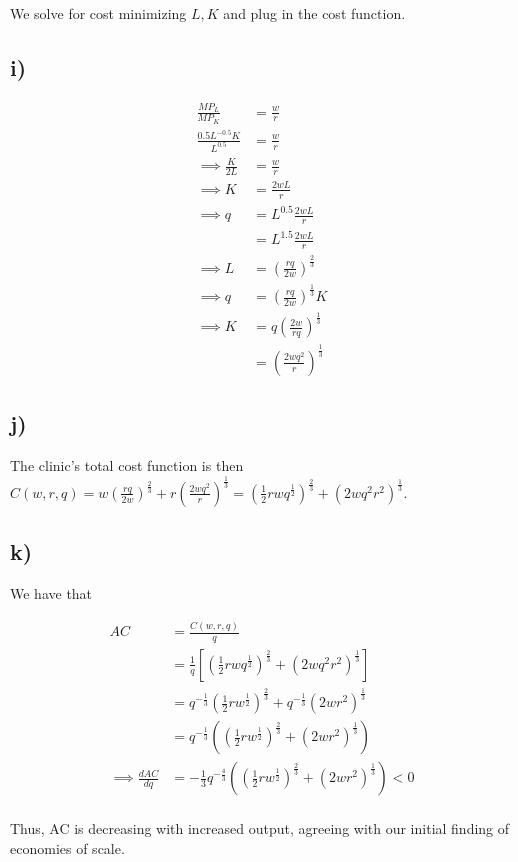 \documentclass[12pt,letterpaper]{article}
\theoremstyle{definition}
\begin{document}
We solve for cost minimizing $L,K$ and plug in the cost function.

\subsection*{i)}

\begin{align*}
  \frac{MP_L}{MP_K} &= \frac{w}{r} \\
  \frac{0.5L^{-0.5}K}{L^{0.5}} &= \frac{w}{r} \\
  \implies \frac{K}{2L} &= \frac{w}{r} \\
  \implies K &= \frac{2wL}{r} \\
  \implies q &= L^{0.5}\frac{2wL}{r} \\
                    &= L^{1.5}\frac{2wL}{r} \\
  \implies L&= (\frac{rq}{2w})^{\frac{2}{3}} \\
  \implies q &= (\frac{rq}{2w})^{\frac{1}{3}} K \\
  \implies K &= q(\frac{2w}{rq})^{\frac{1}{3}} \\
                    &= (\frac{2wq^2}{r})^{\frac{1}{3}}
\end{align*}

\subsection*{j)}

The clinic's total cost function is then $C(w,r,q) =
w(\frac{rq}{2w})^{\frac{2}{3}} + r(\frac{2wq^2}{r})^{\frac{1}{3}} =
(\frac{1}{2}rwq^{\frac{1}{2}})^{\frac{2}{3}} + (2wq^2r^2)^{\frac{1}{3}}$.

\subsection*{k)}

We have that

\begin{align*}
  AC &= \frac{C(w,r,q)}{q} \\
     &= \frac{1}{q} [(\frac{1}{2}rwq^{\frac{1}{2}})^{\frac{2}{3}} + (2wq^2r^2)^{\frac{1}{3}}] \\
     &= q^{-\frac{1}{3}}(\frac{1}{2}rw^{\frac{1}{2}})^{\frac{2}{3}} + q^{-\frac{1}{3}}(2wr^2)^{\frac{1}{3}} \\
     &= q^{-\frac{1}{3}}((\frac{1}{2}rw^{\frac{1}{2}})^{\frac{2}{3}} + (2wr^2)^{\frac{1}{3}}) \\
  \implies \frac{dAC}{dq} &= -\frac{1}{3}q^{-\frac{4}{3}}((\frac{1}{2}rw^{\frac{1}{2}})^{\frac{2}{3}} + (2wr^2)^{\frac{1}{3}}) < 0\\
\end{align*}

Thus, AC is decreasing with increased output, agreeing with our initial finding
of economies of scale.
\end{document}
